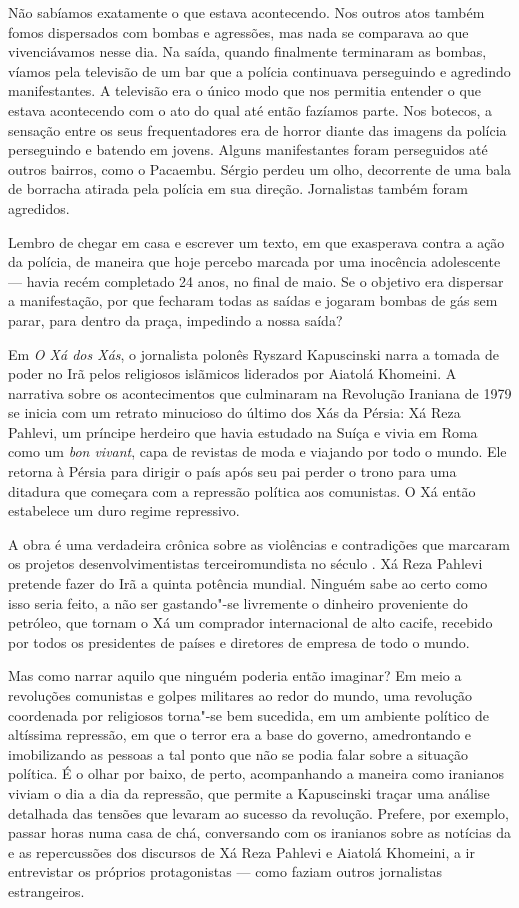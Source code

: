 Não sabíamos exatamente o que estava acontecendo. Nos outros atos também
fomos dispersados com bombas e agressões, mas nada se comparava ao que
vivenciávamos nesse dia. Na saída, quando finalmente terminaram as
bombas, víamos pela televisão de um bar que a polícia continuava
perseguindo e agredindo manifestantes. A televisão era o único modo que
nos permitia entender o que estava acontecendo com o ato do qual até
então fazíamos parte. Nos botecos, a sensação
entre os seus frequentadores era de horror diante das imagens da polícia
perseguindo e batendo em jovens. Alguns manifestantes foram perseguidos
até outros bairros, como o Pacaembu. Sérgio perdeu um olho, decorrente
de uma bala de borracha atirada pela polícia em sua direção. Jornalistas
também foram agredidos.

Lembro de chegar em casa e escrever um texto, em que exasperava contra
a ação da polícia, de maneira que hoje percebo marcada por uma inocência
adolescente --- havia recém completado 24 anos, no final de maio. Se o
objetivo era dispersar a manifestação, por que fecharam todas as saídas
e jogaram bombas de gás sem parar, para dentro da praça, impedindo a
nossa saída?

\asterisc

Em \emph{O Xá dos Xás}, o jornalista polonês Ryszard Kapuscinski narra a
tomada de poder no Irã pelos religiosos islãmicos liderados por Aiatolá
Khomeini. A narrativa sobre os acontecimentos que culminaram na
Revolução Iraniana de 1979 se inicia com um retrato minucioso do último
dos Xás da Pérsia: Xá Reza Pahlevi, um príncipe herdeiro que havia
estudado na Suíça e vivia em Roma como um \emph{bon vivant}, capa de
revistas de moda e viajando por todo o mundo. Ele retorna à Pérsia para
dirigir o país após seu pai perder o trono para uma ditadura que
começara com a repressão política aos comunistas. O Xá então estabelece
um duro regime repressivo.

A obra é uma verdadeira crônica sobre as violências e contradições que
marcaram os projetos desenvolvimentistas terceiromundista no século .
Xá Reza Pahlevi pretende fazer do Irã a quinta potência mundial. Ninguém
sabe ao certo como isso seria feito, a não ser gastando"-se livremente o
dinheiro proveniente do petróleo, que tornam o Xá um comprador internacional
de alto cacife, recebido por todos os presidentes de países e diretores
de empresa de todo o mundo.

Mas como narrar aquilo que ninguém poderia então imaginar? Em meio a
revoluções comunistas e golpes militares ao redor do mundo, uma
revolução coordenada por religiosos torna"-se bem sucedida, em um
ambiente político de altíssima repressão, em que o terror era a base do
governo, amedrontando e imobilizando as pessoas a tal ponto que
não se podia falar sobre a situação política. É o olhar por baixo, de
perto, acompanhando a maneira como iranianos viviam o dia a dia da
repressão, que permite a Kapuscinski traçar uma análise detalhada das
tensões que levaram ao sucesso da revolução. Prefere, por exemplo,
passar horas numa casa de chá, conversando com os iranianos sobre as
notícias da  e as repercussões dos discursos de Xá Reza Pahlevi e
Aiatolá Khomeini, a ir entrevistar os próprios protagonistas --- como
faziam outros jornalistas estrangeiros.

